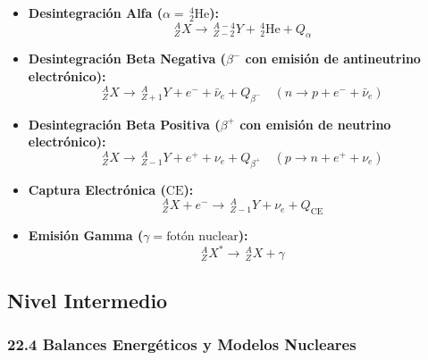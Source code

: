 \documentclass[11pt,a4paper]{article}
\begin{document}
\begin{itemize}
  \item \textbf{Desintegración Alfa ($\alpha = \,_2^4\text{He}$):}
  \[
    _Z^A X \longrightarrow \,_{Z-2}^{A-4} Y + \,_2^4\text{He} + Q_\alpha
  \]
  \item \textbf{Desintegración Beta Negativa ($\beta^-$ con emisión de antineutrino electrónico):}
  \[
    _Z^A X \longrightarrow \,_{Z+1}^A Y + e^- + \bar{\nu}_e + Q_{\beta^-} \quad (n \to p + e^- + \bar{\nu}_e)
  \]
  \item \textbf{Desintegración Beta Positiva ($\beta^+$ con emisión de neutrino electrónico):}
  \[
    _Z^A X \longrightarrow \,_{Z-1}^A Y + e^+ + \nu_e + Q_{\beta^+} \quad (p \to n + e^+ + \nu_e)
  \]
  \item \textbf{Captura Electrónica ($\text{CE}$):}
  \[
    _Z^A X + e^- \longrightarrow \,_{Z-1}^A Y + \nu_e + Q_{\text{CE}}
  \]
  \item \textbf{Emisión Gamma ($\gamma = \text{fotón nuclear}$):}
  \[
    _Z^A X^* \longrightarrow \,_Z^A X + \gamma
  \]
\end{itemize}

\subsection*{Nivel Intermedio}

\subsubsection*{22.4 Balances Energéticos y Modelos Nucleares}
\end{document}
